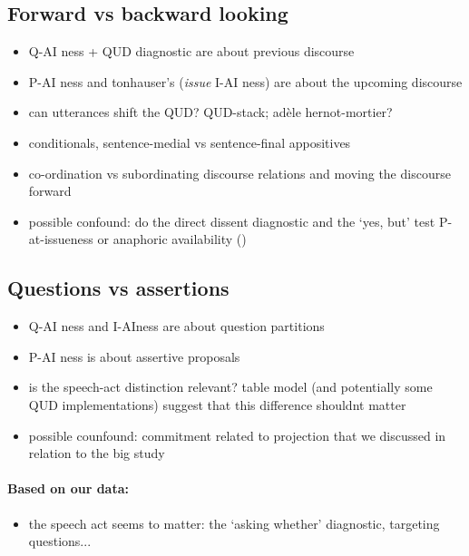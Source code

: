 \documentclass[12pt]{article}
\begin{document}
  \subsection{Forward vs backward looking} %
    \begin{itemize}
      \item Q-AI ness + QUD diagnostic are about previous discourse
      \item P-AI ness and tonhauser's (\emph{issue} I-AI ness) are about the upcoming discourse
      \item can utterances shift the QUD? QUD-stack; adèle hernot-mortier?
      \item conditionals, sentence-medial vs sentence-final appositives
      \item co-ordination vs subordinating discourse relations and moving the discourse forward 
      \item possible confound: do the direct dissent diagnostic and the `yes, but' test P-at-issueness or anaphoric availability (\cite{snider_distinguishing_2018})
    \end{itemize}  
  

  \subsection{Questions vs assertions} %
      \begin{itemize}
        \item Q-AI ness and I-AIness are about question partitions
        \item P-AI ness is about assertive proposals
        \item is the speech-act distinction relevant? table model (and potentially some QUD implementations) suggest that this difference shouldnt matter
        \item possible counfound: commitment related to projection that we discussed in relation to the big study
      \end{itemize}
      
      \paragraph{Based on our data:} %
      
      \begin{itemize}
        \item the speech act seems to matter: the `asking whether' diagnostic, targeting questions...
      \end{itemize}
\end{document}
